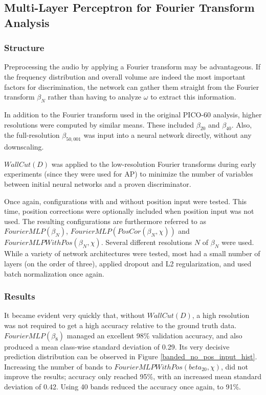 \documentclass[10pt]{article}
\begin{document}
\subsection{Multi-Layer Perceptron for Fourier Transform Analysis}

\subsubsection{Structure}

Preprocessing the audio by applying a Fourier transform may be advantageous. If the frequency distribution and overall volume are indeed the most important factors for discrimination, the network can gather them straight from the Fourier transform $\beta_{N}$ rather than having to analyze $\omega$ to extract this information.

In addition to the Fourier transform used in the original PICO-60 analysis, higher resolutions were computed by similar means. These included $\beta _{20}$ and $\beta _{40}$. Also, the full-resolution $\beta _{50,001}$ was input into a neural network directly, without any downscaling.

$WallCut(D)$ was applied to the low-resolution Fourier transforms during early experiments (since they were used for AP) to minimize the number of variables between initial neural networks and a proven discriminator.

Once again, configurations with and without position input were tested. This time, position corrections were optionally included when position input was not used. The resulting configurations are furthermore referred to as $FourierMLP(\beta_{N})$, $FourierMLP(PosCor(\beta_{N}, \chi))$ and $FourierMLPWithPos(\beta_{N}, \chi)$. Several different resolutions $N$ of $\beta_{N}$ were used. While a variety of network architectures were tested, most had a small number of layers (on the order of three), applied dropout and L2 regularization, and used batch normalization once again.

\subsubsection{Results}

It became evident very quickly that, without $WallCut(D)$, a high resolution was not required to get a high accuracy relative to the ground truth data. $FourierMLP(\beta_{8})$ managed an excellent 98\% validation accuracy, and also produced a mean class-wise standard deviation of 0.29. Its very decisive prediction distribution can be observed in Figure \ref{banded_no_pos_input_hist}. Increasing the number of bands to $FourierMLPWithPos(beta_{20}, \chi)$, did not improve the results; accuracy only reached 95\%, with an increased mean standard deviation of 0.42. Using 40 bands reduced the accuracy once again, to 91\%.
\end{document}
